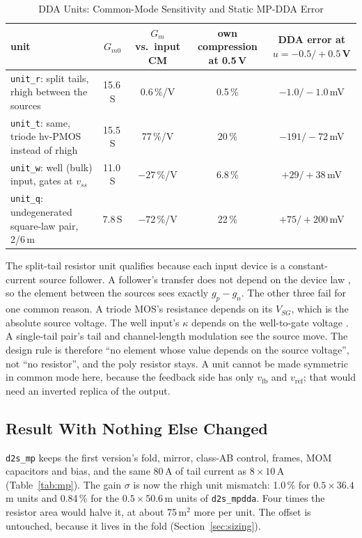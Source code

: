 \documentclass[journal]{IEEEtran}
\newcommand{\cell}[1]{\texttt{#1}}
\newcommand{\um}{\,\textmu m}
\newcommand{\umsq}{\,\textmu m$^2$}
\newcommand{\uA}{\,\textmu A}
\newcommand{\uS}{\,\textmu S}
\newcommand{\mV}{\,mV}
\newcommand{\vref}{v_\mathrm{ref}}
\newcommand{\vfb}{v_\mathrm{fb}}
\begin{document}
\begin{table}[!t]
\caption{DDA Units: Common-Mode Sensitivity and Static MP-DDA Error}
\label{tab:units}
\centering\footnotesize
\begin{tabular}{@{}lcccc@{}}
\toprule
unit & $G_{m0}$ & $G_m$ vs.\ input CM & own compression at 0.5\,V & DDA error at $u=-0.5/+0.5$\,V\\
\midrule
\cell{unit\_r}: split tails, rhigh between the sources & 15.6\uS & 0.6\,\%/V & 0.5\,\% & $-1.0/-1.0$\mV\\
\cell{unit\_t}: same, triode hv-PMOS instead of rhigh & 15.5\uS & 77\,\%/V & 20\,\% & $-191/-72$\mV\\
\cell{unit\_w}: well (bulk) input, gates at $v_{ss}$ \cite{sarpeshkar97} & 11.0\uS & $-27$\,\%/V & 6.8\,\% & $+29/+38$\mV\\
\cell{unit\_q}: undegenerated square-law pair, 2/6\um & 7.8\uS & $-72$\,\%/V & 22\,\% & $+75/+200$\mV\\
\bottomrule
\end{tabular}
\end{table}

The split-tail resistor unit qualifies because each input device is a constant-current
source follower. A follower's transfer does not depend on the device law
\cite[\S7.2.1]{minch97}, so the element between the sources sees exactly $g_p-g_n$. The other
three fail for one common reason. A triode MOS's resistance depends on its $V_{SG}$, which is
the absolute source voltage. The well input's $\kappa$ depends on the well-to-gate voltage
\cite[\S3.3.1]{sarpeshkar97}. A single-tail pair's tail and channel-length modulation see the
source move. The design rule is therefore ``no element whose value depends on the source
voltage'', not ``no resistor'', and the poly resistor stays. A unit cannot be made symmetric
in common mode here, because the feedback side has only $\vfb$ and $\vref$; that would need
an inverted replica of the output.

\subsection{Result With Nothing Else Changed}
\cell{d2s\_mp} keeps the first version's fold, mirror, class-AB control, frames, MOM
capacitors and bias, and the same 80\uA{} of tail current as $8\times10$\uA{}
(Table~\ref{tab:mp}). The gain $\sigma$ is now the rhigh unit mismatch: 1.0\,\% for
$0.5\times36.4$\um{} units and 0.84\,\% for the $0.5\times50.6$\um{} units of
\cell{d2s\_mpdda}. Four times the resistor area would halve it, at about 75\umsq{} more per
unit. The offset is untouched, because it lives in the fold (Section~\ref{sec:sizing}).
\end{document}
